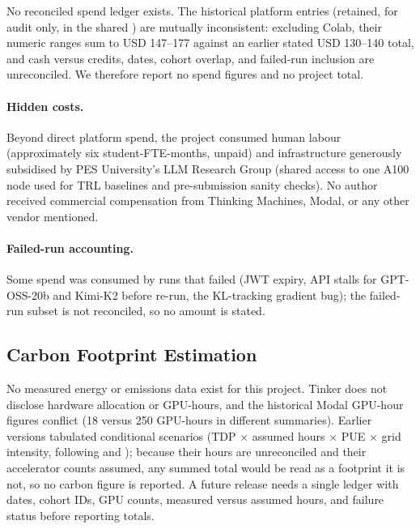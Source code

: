 No reconciled spend ledger exists. The historical platform entries (retained,
for audit only, in the shared )
are mutually inconsistent: excluding Colab, their numeric ranges sum to USD
147--177 against an earlier stated USD 130--140 total, and cash versus credits,
dates, cohort overlap, and failed-run inclusion are unreconciled. We therefore
report no spend figures and no project total.

\paragraph{Hidden costs.} Beyond direct platform spend, the project
consumed human labour (approximately six student-FTE-months, unpaid) and
infrastructure generously subsidised by PES University's LLM Research
Group (shared access to one A100 node used for TRL baselines and
pre-submission sanity checks). No author received commercial compensation
from Thinking Machines, Modal, or any other vendor mentioned.

\paragraph{Failed-run accounting.} Some spend was consumed by runs that
failed (JWT expiry, API stalls for GPT-OSS-20b and Kimi-K2 before re-run, the
KL-tracking gradient bug); the failed-run subset is not reconciled, so no
amount is stated.

\subsection{Carbon Footprint Estimation}
\label{sec:carbon}

No measured energy or emissions data exist for this project. Tinker does not
disclose hardware allocation or GPU-hours, and the historical Modal GPU-hour
figures conflict (18 versus 250 GPU-hours in different summaries). Earlier
versions tabulated conditional scenarios (TDP $\times$ assumed hours $\times$
PUE $\times$ grid intensity, following \citet{patterson2024empirical} and
\citet{strubell2019energy}); because their hours are unreconciled and their
accelerator counts assumed, any summed total would be read as a footprint it is
not, so no carbon figure is reported. A future release needs a single ledger
with dates, cohort IDs, GPU counts, measured versus assumed hours, and failure
status before reporting totals.


